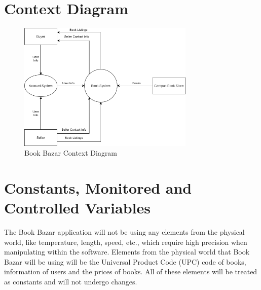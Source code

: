 \documentclass[fullpage]{article}
\begin{document}
\newpage

\section{Context Diagram}
\label{sec:context}

\begin{figure}[h!]
    \centering
     \includegraphics[width=0.75\textwidth]{a.png}
    \caption{Book Bazar Context Diagram}
    \label{ContextDiagram}
\end{figure}

\section{Constants, Monitored and Controlled Variables}
The Book Bazar application will not be using any elements from the physical world, like temperature, length, speed, etc., which require high precision when manipulating within the software. Elements from the physical world that Book Bazar will be using will be the Universal Product Code (UPC) code of books, information of users and the prices of books. All of these elements will be treated as constants and will not undergo changes.
\end{document}
